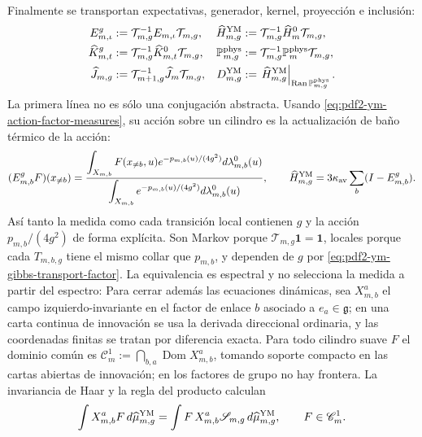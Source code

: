 Finalmente se transportan expectativas, generador, kernel, proyección e inclusión:
\begin{equation}\label{eq:pdf2-ym-g-dynamics}
 \begin{aligned}
 E_{m,\iota}^{g}&:=\mathcal T_{m,g}^{-1}E_{m,\iota}\mathcal T_{m,g},&
 \widehat H_{m,g}^{\rm YM}&:=\mathcal T_{m,g}^{-1}\widehat H_m^0\mathcal T_{m,g},\\
 \widehat K_{m,t}^{g}&:=\mathcal T_{m,g}^{-1}\widehat K_{m,t}^{0}\mathcal T_{m,g},&
 \mathbb P_{m,g}^{\rm phys}&:=\mathcal T_{m,g}^{-1}
     \mathbb P_m^{\rm phys}\mathcal T_{m,g},\\
 \widehat J_{m,g}&:=\mathcal T_{m+1,g}^{-1}
     \widehat J_m\mathcal T_{m,g},&
 D_{m,g}^{\rm YM}&:=\left.\widehat H_{m,g}^{\rm YM}
     \right|_{\operatorname{Ran}\mathbb P_{m,g}^{\rm phys}}.
 \end{aligned}
\end{equation}
La primera línea no es sólo una conjugación abstracta. Usando
\eqref{eq:pdf2-ym-action-factor-measures}, su acción sobre un cilindro es la
actualización de baño térmico de la acción:
\begin{equation}\label{eq:pdf2-ym-gibbs-conditional-expectation}
 (E_{m,b}^{g}F)(x_{\ne b})
 =\frac{\displaystyle
   \int_{X_{m,b}}F(x_{\ne b},u)e^{-p_{m,b}(u)/(4g^2)}
       d\lambda_{m,b}^0(u)}{\displaystyle
   \int_{X_{m,b}}e^{-p_{m,b}(u)/(4g^2)}d\lambda_{m,b}^0(u)},
 \qquad
 \widehat H_{m,g}^{\rm YM}
 =3\kappa_{\rm av}\sum_b(I-E_{m,b}^{g}).
\end{equation}
Así tanto la medida como cada transición local contienen $g$ y la acción
$p_{m,b}/(4g^2)$ de forma explícita.
Son Markov porque $\mathcal T_{m,g}\mathbf1=\mathbf1$, locales porque cada
$T_{m,b,g}$ tiene el mismo collar que $p_{m,b}$, y dependen de $g$ por
\eqref{eq:pdf2-ym-gibbs-transport-factor}. La equivalencia es espectral y no
selecciona la medida a partir del espectro:
Para cerrar además las ecuaciones dinámicas, sea $X_{m,b}^a$ el campo
izquierdo-invariante en el factor de enlace $b$ asociado a
$e_a\in\mathfrak g$; en una carta continua de innovación se usa la derivada
direccional ordinaria, y las coordenadas finitas se tratan por diferencia exacta.
Para todo cilindro suave $F$ el dominio común es
$\mathscr C_m^1:=\bigcap_{b,a}\operatorname{Dom}X_{m,b}^a$, tomando soporte
compacto en las cartas abiertas de innovación; en los factores de grupo no hay
frontera. La invariancia de Haar y la regla del producto calculan
\begin{equation}\label{eq:pdf2-ym-schwinger-dyson-finite}
 \int X_{m,b}^aF\,d\widehat\mu_{m,g}^{\rm YM}
 =\int F\,X_{m,b}^a\mathscr S_{m,g}\,d\widehat\mu_{m,g}^{\rm YM},
 \qquad F\in\mathscr C_m^1.
\end{equation}
